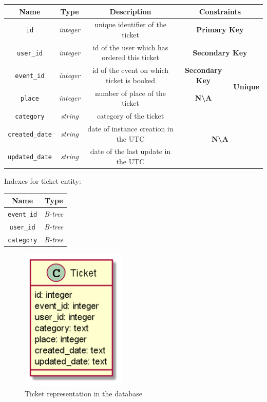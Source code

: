 \begin{center}
    \begin{tabular}{ | c | c | c | c | c |}
        \hline
        \textbf{Name} & \textbf{Type} & \textbf{Description} & \multicolumn{2}{c|}{\textbf{Constraints}} \\ \hline
        \texttt{id} & \textit{integer} & unique identifier of the ticket & \multicolumn{2}{c|}{\textbf{\color{red}Primary Key}} \\ \hline
        \texttt{user\_id} & \textit{integer} & id of the user which has ordered this ticket & \multicolumn{2}{c|}{\textbf{\color{SecondaryKeyColor}Secondary Key}} \\ \hline
        \texttt{event\_id} & \textit{integer} & id of the event on which ticket is booked & \textbf{\color{SecondaryKeyColor}Secondary Key}  & \multirow{2}{*}{\textbf{\color{blue}Unique}} \\ \cline{0-3}
        \texttt{place}     & \textit{integer} & number of place of the ticket             & \textbf{N\textbackslash{A}}                                     &                                              \\ \hline
        \texttt{category} & \textit{string} & category of the ticket & \multicolumn{2}{c|}{\multirow{3}{*}{\textbf{N\textbackslash{A}}}} \\ \cline{0-2}
        \texttt{created\_date} & \textit{string} & date of instance creation in the UTC & \multicolumn{2}{c|}{} \\ \cline{0-2}
        \texttt{updated\_date} & \textit{string} & date of the last update in the UTC & \multicolumn{2}{c|}{} \\ \hline
    \end{tabular}
\end{center}

Indexes for ticket entity:

\begin{center}
    \begin{tabular}{ | c | c | }
        \hline
        \textbf{Name}  & \textbf{Type}   \\ \hline
        \texttt{event\_id}  & \textit{B-tree} \\ \hline
        \texttt{user\_id}  & \textit{B-tree} \\ \hline
        \texttt{category} & \textit{B-tree} \\ \hline
    \end{tabular}
\end{center}

\begin{figure}[h]
    \centering
    \includegraphics[width=0.45\textwidth]{images/ticket}
    \caption{Ticket representation in the database}
    \label{fig:ticket_db_1}
\end{figure}